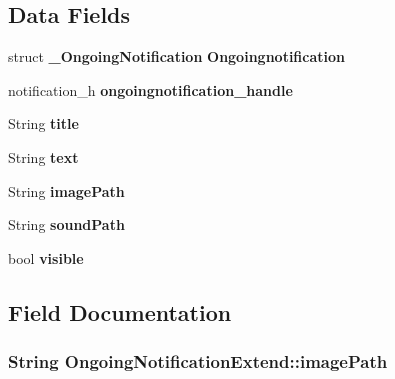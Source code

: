 \subsection*{Data Fields}
\begin{DoxyCompactItemize}
\item 
struct {\bf \-\_\-\-Ongoing\-Notification} {\bfseries Ongoingnotification}\label{structOngoingNotificationExtend_ade33214f57c4ac4920a996b1e0335a22}

\item 
notification\-\_\-h {\bfseries ongoingnotification\-\_\-handle}\label{structOngoingNotificationExtend_a3f1490bbf658d50cace284573a76a805}

\item 
String {\bfseries title}\label{structOngoingNotificationExtend_afae53badf9421ff37ea446299d6fc48b}

\item 
String {\bfseries text}\label{structOngoingNotificationExtend_ada80e826c02f82f33d4f356c34ba16ea}

\item 
String {\bfseries image\-Path}\label{structOngoingNotificationExtend_ab9b938e5bf688cfa771f2a160586a441}

\item 
String {\bfseries sound\-Path}\label{structOngoingNotificationExtend_a6b7598fd72d84c57272adaaa57d2be30}

\item 
bool {\bfseries visible}\label{structOngoingNotificationExtend_ab4c1c650129c5ccddc1c152076e9626a}

\end{DoxyCompactItemize}


\subsection{Field Documentation}
\subsubsection[{image\-Path}]{\setlength{\rightskip}{0pt plus 5cm}String Ongoing\-Notification\-Extend\-::image\-Path}\label{structOngoingNotificationExtend_ab9b938e5bf688cfa771f2a160586a441}
